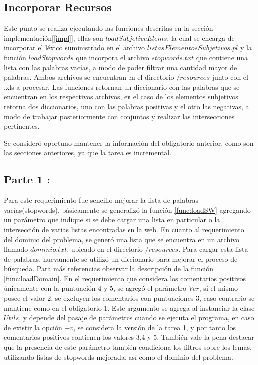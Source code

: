 \documentclass[12pt]{article}
\begin{document}
\subsection{Incorporar Recursos}
Este punto se realiza ejecutando las funciones descritas en la sección implementación[\ref{impl}], ellas son $loadSubjetiveElems$, la cual se encarga de incorporar el léxico suministrado en el archivo $listasElementosSubjetivos.pl$ y la función $loadStopwords$ que incorpora el archivo $stopwords.txt$ que contiene una lista con las palabras vacías, a modo de poder filtrar una cantidad mayor de palabras.
Ambos archivos se encuentran en el directorio $/resources$ junto con el .xls a procesar.
Las funciones retornan un diccionario con las palabras que se encuentran en los respectivos archivos, en el caso de los elementos subjetivos retorna dos diccionarios, uno con las palabras positivas y el otro las negativas, a modo de trabajar posteriormente con conjuntos y realizar las intersecciones pertinentes.

Se consideró oportuno mantener la información del obligatorio anterior, como son las secciones anteriores, ya que la tarea es incremental.

\subsection{Parte 1 :}
Para este requerimiento fue sencillo mejorar la lista de palabras vacías(stopwords), básicamente se generalizó la función \ref{func:loadSW} agregando un parámetro que indique si se debe cargar una lista en particular o la intersección de varias listas encontradas en la web.
En cuanto al requerimiento del dominio del problema, se generó una lista que se encuentra en un archivo llamado $dominio.txt$, ubicado en el directorio $/resources$. Para cargar esta lista de palabras, nuevamente se utilizó un diccionario para mejorar el proceso de búsqueda. Para más referencias observar la descripción de la función \ref{func:loadDomain}.
En el requerimiento que considera los comentarios positivos únicamente con la puntuación 4 y 5, se agregó el parámetro $Ver$, si el mismo posee el valor $2$, se excluyen los comentarios con puntuaciones 3, caso contrario se mantiene como en el obligatorio 1. Este argumento se agrega al instanciar la clase $Utils$, y depende del pasaje de parámetros cuando se ejecuta el programa, en caso de existir la opción $-v$, se considera la versión de la tarea 1, y por tanto los comentarios positivos contienen los valores 3,4 y 5. También vale la pena destacar que la presencia de este parámetro también condiciona los filtros sobre los lemas, utilizando listas de stopwords mejorada, así como el dominio del problema.
\end{document}
